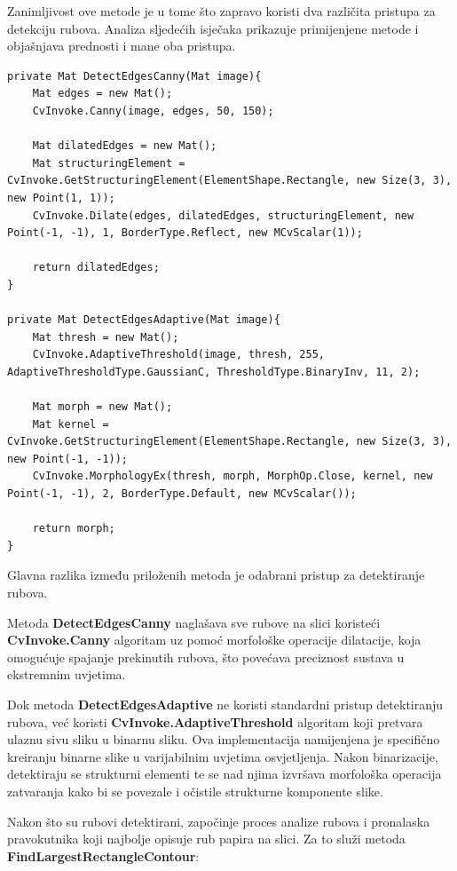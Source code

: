 \documentclass{foi}
\begin{document}
Zanimljivost ove metode je u tome što zapravo koristi dva različita pristupa za detekciju rubova. Analiza sljedećih isječaka prikazuje primijenjene metode i objašnjava prednosti i mane oba pristupa.

\pagebreak
\begin{lstlisting}[caption={Metoda za detekciju rubova tijekom ispravka perspektive}]
private Mat DetectEdgesCanny(Mat image){
    Mat edges = new Mat();
    CvInvoke.Canny(image, edges, 50, 150);

    Mat dilatedEdges = new Mat();
    Mat structuringElement = CvInvoke.GetStructuringElement(ElementShape.Rectangle, new Size(3, 3), new Point(1, 1));
    CvInvoke.Dilate(edges, dilatedEdges, structuringElement, new Point(-1, -1), 1, BorderType.Reflect, new MCvScalar(1));

    return dilatedEdges;
}

private Mat DetectEdgesAdaptive(Mat image){
    Mat thresh = new Mat();
    CvInvoke.AdaptiveThreshold(image, thresh, 255, AdaptiveThresholdType.GaussianC, ThresholdType.BinaryInv, 11, 2);

    Mat morph = new Mat();
    Mat kernel = CvInvoke.GetStructuringElement(ElementShape.Rectangle, new Size(3, 3), new Point(-1, -1));
    CvInvoke.MorphologyEx(thresh, morph, MorphOp.Close, kernel, new Point(-1, -1), 2, BorderType.Default, new MCvScalar());

    return morph;
}
\end{lstlisting}

Glavna razlika između priloženih metoda je odabrani pristup za detektiranje rubova.

Metoda \textbf{DetectEdgesCanny} naglašava sve rubove na slici koristeći \textbf{CvInvoke.Canny} algoritam uz pomoć morfološke operacije dilatacije, koja omogućuje spajanje prekinutih rubova, što povećava preciznost sustava u ekstremnim uvjetima.

Dok metoda \textbf{DetectEdgesAdaptive} ne koristi standardni pristup detektiranju rubova, već koristi \textbf{CvInvoke.AdaptiveThreshold} algoritam koji pretvara ulaznu sivu sliku u binarnu sliku. Ova implementacija namijenjena je specifično kreiranju binarne slike u varijabilnim uvjetima osvjetljenja. Nakon binarizacije, detektiraju se strukturni elementi te se nad njima izvršava morfološka operacija zatvaranja kako bi se povezale i očistile strukturne komponente slike.


Nakon što su rubovi detektirani, započinje proces analize rubova i pronalaska pravokutnika koji najbolje opisuje rub papira na slici. Za to služi metoda \textbf{FindLargestRectangleContour}:
\end{document}
